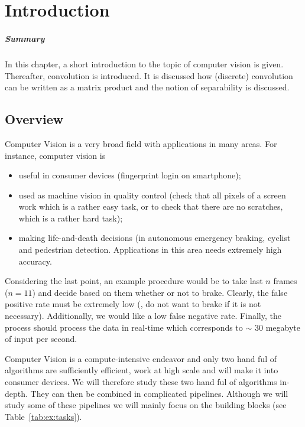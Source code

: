 \chapter{Introduction}
\paragraph{Summary} In this chapter, a short introduction to the topic of
computer vision is given. Thereafter, convolution is introduced. It is discussed
how (discrete) convolution can be written as a matrix product and the notion of
separability is discussed.

\section*{Overview}
Computer Vision is a very broad field with applications in many areas. For
instance, computer vision is
\begin{itemize}
\item useful in consumer devices (\eg fingerprint login on smartphone);
\item used as machine vision in quality control (\eg check that all pixels of a
  screen work which is a rather easy task, or to check that there are no
  scratches, which is a rather hard task);
\item making life-and-death decisions (\eg in autonomous emergency braking,
  cyclist and pedestrian detection. Applications in this area needs extremely
  high accuracy.
\end{itemize}
Considering the last point, an example procedure would be to take last $n$
frames (\eg $n = 11$) and decide based on them whether or not to brake. Clearly,
the false positive rate must be extremely low (\ie, do not want to brake if it
is not necessary). Additionally, we would like a low false negative
rate. Finally, the process should process the data in real-time which
corresponds to $\sim$ 30 megabyte of input per second.

Computer Vision is a compute-intensive endeavor and only two hand ful of
algorithms are sufficiently efficient, \ie work at high scale and will make it
into consumer devices. We will therefore study these two hand ful of algorithms
in-depth. They can then be combined in complicated pipelines. Although we will
study some of these pipelines we will mainly focus on the building blocks (see
Table~\ref{tab:ex:tasks}).


